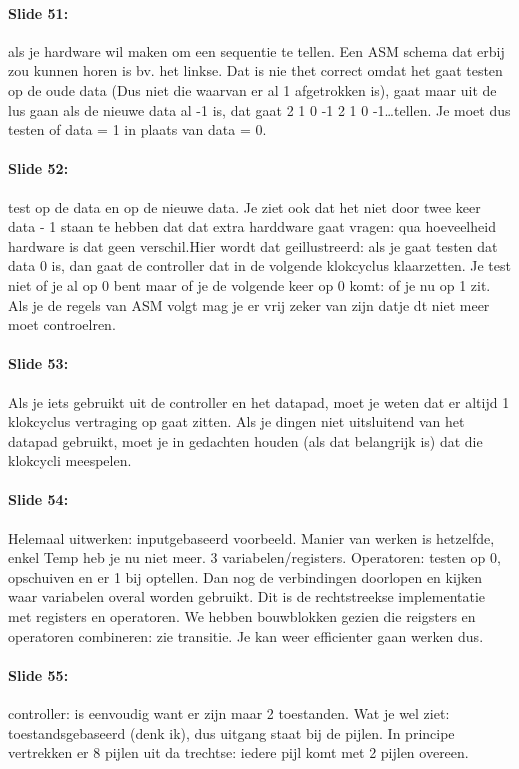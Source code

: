 \documentclass[10pt,a4paper]{book}
\begin{document}
\paragraph{Slide 51:} als je hardware wil maken om een sequentie te tellen. Een ASM schema dat erbij zou kunnen horen is bv. het linkse. Dat is nie thet correct omdat het gaat testen op de oude data (Dus niet die waarvan er al 1 afgetrokken is), gaat maar uit de lus gaan als de nieuwe data al -1 is, dat gaat 2 1 0 -1 2 1 0 -1\ldots tellen. Je moet dus testen of data = 1 in plaats van data = 0.

\paragraph{Slide 52:} test op de data en op de nieuwe data. Je ziet ook dat het niet door twee keer data - 1 staan te hebben dat dat extra harddware gaat vragen: qua hoeveelheid hardware is dat geen verschil.Hier wordt dat geillustreerd: als je gaat testen dat data 0 is, dan gaat de controller dat in de volgende klokcyclus klaarzetten. Je test niet of je al op 0 bent maar of je de volgende keer op 0 komt: of je nu op 1 zit. Als je de regels van ASM volgt mag je er vrij zeker van zijn datje dt niet meer moet controelren. 

\paragraph{Slide 53:} Als je iets gebruikt uit de controller en het datapad, moet je weten dat er altijd 1 klokcyclus vertraging op gaat zitten. Als je dingen niet uitsluitend van het datapad gebruikt, moet je in gedachten houden (als dat belangrijk is) dat die klokcycli meespelen.

\paragraph{Slide 54:} Helemaal uitwerken: inputgebaseerd voorbeeld. Manier van werken is hetzelfde, enkel Temp heb je nu niet meer. 3 variabelen/registers. Operatoren: testen op 0, opschuiven en er 1 bij optellen. Dan nog de verbindingen doorlopen en kijken waar variabelen overal worden gebruikt. Dit is de rechtstreekse implementatie met registers en operatoren. We hebben bouwblokken gezien die reigsters en operatoren combineren: zie transitie. Je kan weer efficienter gaan werken dus.

\paragraph{Slide 55:} controller: is eenvoudig want er zijn maar 2 toestanden. Wat je wel ziet: toestandsgebaseerd (denk ik), dus uitgang staat bij de pijlen. In principe vertrekken er 8 pijlen uit da trechtse: iedere pijl komt met 2 pijlen overeen. 
\end{document}
